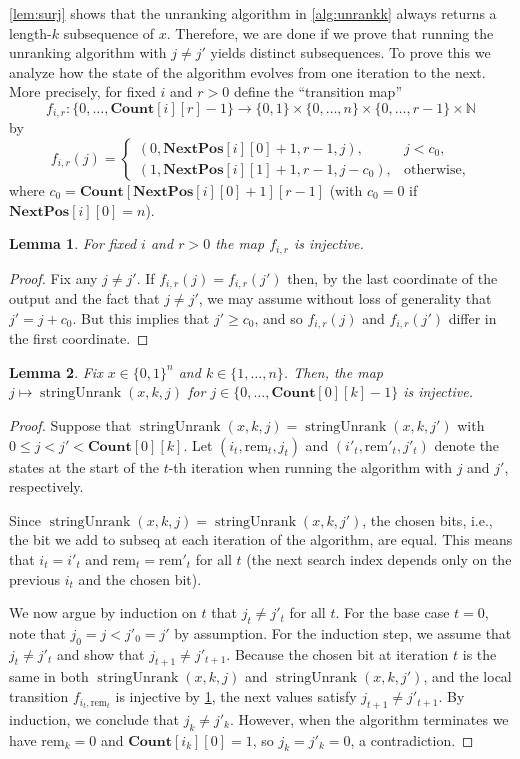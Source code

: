 \documentclass[11pt]{article}
\newcommand{\N}{\mathbb{N}}
\newcommand{\NextPos}{\mathbf{NextPos}}
\newcommand{\Cnt}{\mathbf{Count}}
\newcommand{\rem}{\mathrm{rem}}
\newcommand{\subseq}{\mathrm{subseq}}
\newcommand{\unrankk}{\operatorname{stringUnrank}}
\newtheorem{lemma}{Lemma}
\newcommand{\bits}{\{0,1\}}
\begin{document}
\cref{lem:surj} shows that the unranking algorithm in \cref{alg:unrankk} always returns a length-$k$ subsequence of $x$.
Therefore, we are done if we prove that running the unranking algorithm with $j\neq j'$ yields distinct subsequences.
To prove this we analyze how the state of the algorithm evolves from one iteration to the next.
More precisely, for fixed $i$ and $r>0$ define the ``transition map''
\[
f_{i,r}:\{0,\dots,\Cnt[i][r]-1\}\longrightarrow
\{0,1\}\times\{0,\dots,n\}\times\{0,\dots,r-1\}\times\N
\]
by
\[
f_{i,r}(j)=
\begin{cases}
(0, \NextPos[i][0]+1,r-1, j), & j<c_0,\\
(1, \NextPos[i][1]+1, r-1, j-c_0), & \text{otherwise,}
\end{cases}
\]
where $c_0=\Cnt[\NextPos[i][0]+1][r-1]$ (with $c_0=0$ if $\NextPos[i][0]=n$).

\begin{lemma}\label{lemma:f_injective}
For fixed $i$ and $r>0$ the map $f_{i,r}$ is injective.
\end{lemma}
\begin{proof}
Fix any $j\neq j'$.
If $f_{i,r}(j)=f_{i,r}(j')$ then, by the last coordinate of the output and the fact that $j\neq j'$, we may assume without loss of generality that $j'=j+c_0$.
But this implies that $j'\geq c_0$, and so $f_{i,r}(j)$ and $f_{i,r}(j')$ differ in the first coordinate.
\end{proof}

\begin{lemma}\label{lem:glob_injk}
Fix $x\in\bits^n$ and $k\in\{1,\dots,n\}$.
Then, the map $j\mapsto \unrankk(x,k,j)$ for $j \in \{0,\dots, \Cnt[0][k]-1\}$ is injective.
\end{lemma}
\begin{proof}
Suppose that $\unrankk(x,k,j)=\unrankk(x,k,j')$ with $0\le j<j'<\Cnt[0][k]$. 
Let $ (i_t,\rem_t,j_t)$ and $ (i'_t,\rem'_t,j'_t)$ denote the states at the start of the $t$-th iteration when running the algorithm with $j$ and $j'$, respectively. 

Since  $\unrankk(x,k,j)=\unrankk(x,k,j')$, the chosen bits, i.e., the bit we add to $\subseq$ at each iteration of the algorithm, are equal.
This means that $i_t=i'_t$ and $\rem_t=\rem'_t$ for all $t$ (the next search index depends only on the previous $i_t$ and the chosen bit). 

We now argue by induction on $t$ that $j_t \neq j'_t$ for all $t$.
For the base case $t=0$, note that $j_0=j<j'_0=j'$ by assumption.
For the induction step, we assume that $j_t\neq j'_t$ and show that $j_{t+1}\neq j'_{t+1}$. 
Because the chosen bit at iteration $t$ is the same in both $\unrankk(x,k,j)$ and $\unrankk(x,k,j')$, and the local transition $f_{i_t,\rem_t}$ is injective by \cref{lemma:f_injective}, the next values satisfy $j_{t+1} \neq j'_{t+1}$. 
By induction, we conclude that $j_k \neq j'_k$.
However, when the algorithm terminates we have $\rem_k=0$ and $\Cnt[i_k][0]=1$, so $j_k=j'_k=0$, a contradiction.
\end{proof}
\end{document}
